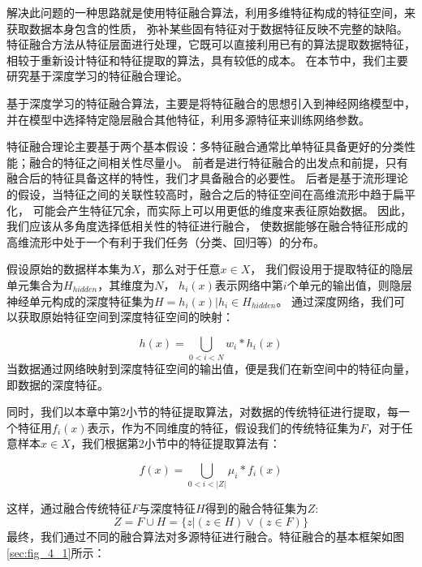 解决此问题的一种思路就是使用特征融合算法，利用多维特征构成的特征空间，来获取数据本身包含的性质，
弥补某些固有特征对于数据特征反映不完整的缺陷。
特征融合方法从特征层面进行处理，它既可以直接利用已有的算法提取数据特征，
相较于重新设计特征和特征提取的算法，具有较低的成本。
在本节中，我们主要研究基于深度学习的特征融合理论。\par

基于深度学习的特征融合算法，主要是将特征融合的思想引入到神经网络模型中，
并在模型中选择特定隐层融合其他特征，利用多源特征来训练网络参数。\par

特征融合理论主要基于两个基本假设：多特征融合通常比单特征具备更好的分类性能；融合的特征之间相关性尽量小。
前者是进行特征融合的出发点和前提，只有融合后的特征具备这样的特性，我们才具备融合的必要性。
后者是基于流形理论的假设，当特征之间的关联性较高时，融合之后的特征空间在高维流形中趋于扁平化，
可能会产生特征冗余，而实际上可以用更低的维度来表征原始数据。
因此，我们应该从多角度选择低相关性的特征进行融合，
使数据能够在融合特征形成的高维流形中处于一个有利于我们任务（分类、回归等）的分布。\par

假设原始的数据样本集为$X$，那么对于任意${x \in X}$，
我们假设用于提取特征的隐层单元集合为$H_{hidden}$，其维度为$N$，
$h_i(x)$表示网络中第$i$个单元的输出值，则隐层神经单元构成的深度特征集为$H={h_i(x)|h_i \in H_{hidden}}$。
通过深度网络，我们可以获取原始特征空间到深度特征空间的映射：\par
\begin{equation}
	\label{eqt_4_15}
	h(x) = \bigcup_{0<i<N} w_i * h_{i}(x)
\end{equation}
当数据通过网络映射到深度特征空间的输出值，便是我们在新空间中的特征向量，即数据的深度特征。\par

同时，我们以本章中第2小节的特征提取算法，对数据的传统特征进行提取，每一个特征用$f_{i}(x)$表示，作为不同维度的特征，假设我们的传统特征集为$F$，对于任意样本$x \in X$，我们根据第2小节中的特征提取算法有：\par
\begin{equation}
	\label{eqt_4_16}
	f(x) = \bigcup_{0<i<|Z|}\mu_{i} * f_{i}(x)
\end{equation}

这样，通过融合传统特征$F$与深度特征$H$得到的融合特征集为$Z$:
\begin{equation}
\label{eqt_4_17}
	Z =F \cup H = \{ z | (z \in H) \vee (z \in F) \}
\end{equation}
最终，我们通过不同的融合算法对多源特征进行融合。特征融合的基本框架如图\ref{sec:fig_4_1}所示：


